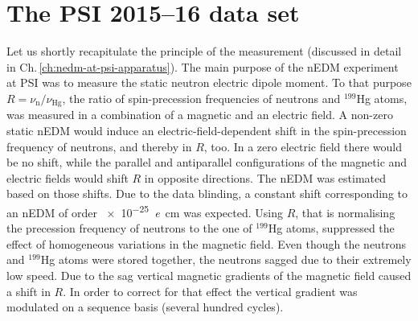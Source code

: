 \section{The PSI 2015--16 data set}
Let us shortly recapitulate the principle of the measurement (discussed in detail in Ch.\,\ref{ch:nedm-at-psi-apparatus}).
The main purpose of the nEDM experiment at PSI was to measure the static neutron electric dipole moment.
To that purpose $R = \nu_\text{n} / \nu_\text{Hg}$, the ratio of spin-precession frequencies of neutrons and ${}^{199}$Hg atoms, was measured in a combination of a magnetic and an electric field.
A non-zero static nEDM would induce an electric-field-dependent shift in the spin-precession frequency of neutrons, and thereby in $R$, too.
In a zero electric field there would be no shift, while the parallel and antiparallel configurations of the magnetic and electric fields would shift $R$ in opposite directions.
The nEDM was estimated based on those shifts.
Due to the data blinding,
a constant shift corresponding to an nEDM of order \SI{e-25}{\elementarycharge\centi\meter} was expected.
Using $R$, that is normalising the precession frequency of neutrons to the one of ${}^{199}$Hg atoms, suppressed the effect of homogeneous variations in the magnetic field.
Even though the neutrons and ${}^{199}$Hg atoms were stored together, the neutrons sagged due to their extremely low speed.
Due to the sag vertical magnetic gradients of the magnetic field caused a shift in $R$.
In order to correct for that effect the vertical gradient was modulated on a sequence basis (several hundred cycles).

